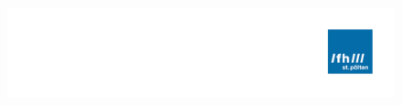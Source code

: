 


\pagestyle{empty}

\begin{figure}[H]
\vspace*{-2.5cm}
\hspace*{2.5cm}
\includegraphics[keepaspectratio, width=1.4\textwidth, right]{TemplateElements/fhLogo3.png}
\end{figure}




